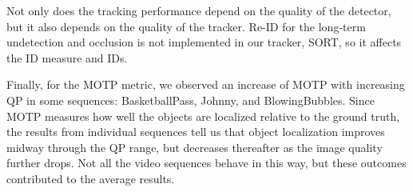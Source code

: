 Not only does the tracking performance depend on the quality of the detector, but it also depends on the quality of the tracker. Re-ID for the long-term undetection and occlusion is not implemented in our tracker, SORT, so it affects the ID measure and IDs.

Finally, for the MOTP metric, we observed an increase of MOTP with increasing QP in some sequences: BasketballPass, Johnny, and BlowingBubbles. Since MOTP measures how well the objects are localized relative to the ground truth, the results from individual sequences tell us that object localization improves midway through the QP range, but decreases thereafter as the image quality further drops. Not all the video sequences behave in this way, but these outcomes contributed to the average results.